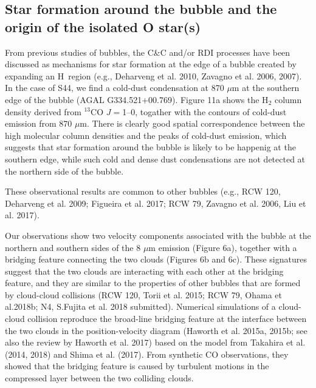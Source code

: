 \documentclass[onecolumn]{pasj01}
\begin{document}
{{{{{{{\subsection{Star formation around the bubble and the origin of {the isolated O star(s)}}
{From previous studies of bubbles, {the C\&C and/or RDI processes have} been discussed {as} {mechanisms for star formation at the edge of a bubble created} by {expanding an H\, region} (e.g., Deharveng et al. 2010, Zavagno et al. 2006, 2007). 
In the case of S44, we {find a cold-dust condensation at} 870 $\mu$m at the southern edge of the bubble (AGAL G334.521+00.769).
{Figure 11a} shows the H$_2$ column density {derived} from $^{13}$CO $J=$1--0{, togather} with the contours of cold-dust emission} from 870 $\mu$m. 
{There is clearly} {good spatial} correspondence between the high molecular column {densities} and {the peaks of} cold-dust emission, {which suggests that {star formation around the bubble is likely to be happenig at} the southern edge}, while such cold and {dense dust condensations} are not detected at the northern side of the bubble.}
These observational results are common to other bubbles (e.g., RCW 120, Deharveng et al. 2009; Figueira et al. 2017; RCW 79, Zavagno et al. 2006, Liu et al. 2017). 


{Our observations} show two velocity components associated with the bubble {at the} {northern and southern side{s of} the 8 $\mu$m emission} ({Figure 6a}), {together with a} bridging feature connecting {the} two clouds ({Figures 6b and 6c}). These signatures suggest that {the} two clouds are interacting with each other {at the bridging feature}, and {they} are similar {to the} {properties of} other bubbles {that are formed by cloud-cloud collisions} (RCW 120, Torii et al. 2015; RCW 79, Ohama et al.2018b; N4, S.Fujita et al. 2018 submitted). 
{Numerical simulations of a cloud-cloud collision {reproduce} the broad-{line} bridging feature {at} the interface between the two clouds {in} the position-velocity diagram (Haworth et al. 2015a, 2015b; see also the review by {Haworth et al. 2017}) based on the model from Takahira et al. (2014, 2018) and Shima et al. (2017). 
From synthetic CO observations, they showed that the bridging feature is caused by turbulent motions in the compressed layer between the two colliding clouds.} 

}}}}}}
\end{document}
